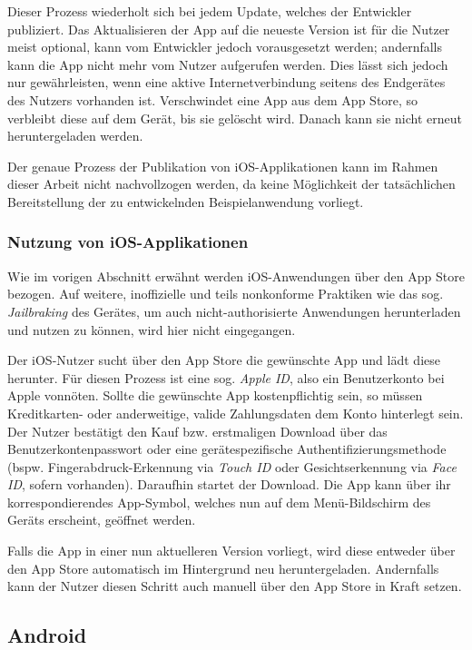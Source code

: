 Dieser Prozess wiederholt sich bei jedem Update, welches der Entwickler publiziert. Das Aktualisieren der App auf die neueste Version ist für die Nutzer meist optional, kann vom Entwickler jedoch vorausgesetzt werden; andernfalls kann die App nicht mehr vom Nutzer aufgerufen werden. Dies lässt sich jedoch nur gewährleisten, wenn eine aktive Internetverbindung seitens des Endgerätes des Nutzers vorhanden ist. Verschwindet eine App aus dem App Store, so verbleibt diese auf dem Gerät, bis sie gelöscht wird. Danach kann sie nicht erneut heruntergeladen werden.

Der genaue Prozess der Publikation von iOS-Applikationen kann im Rahmen dieser Arbeit nicht nachvollzogen werden, da keine Möglichkeit der tatsächlichen Bereitstellung der zu entwickelnden Beispielanwendung vorliegt.

\subsubsection{Nutzung von iOS-Applikationen}
Wie im vorigen Abschnitt erwähnt werden iOS-Anwendungen über den App Store bezogen. Auf weitere, inoffizielle und teils nonkonforme Praktiken wie das sog. \textit{Jailbraking} des Gerätes, um auch nicht-authorisierte Anwendungen herunterladen und nutzen zu können, wird hier nicht eingegangen.

Der iOS-Nutzer sucht über den App Store die gewünschte App und lädt diese herunter. Für diesen Prozess ist eine sog. \textit{Apple ID}, also ein Benutzerkonto bei Apple vonnöten. Sollte die gewünschte App kostenpflichtig sein, so müssen Kreditkarten- oder anderweitige, valide Zahlungsdaten dem Konto hinterlegt sein. Der Nutzer bestätigt den Kauf bzw. erstmaligen Download über das Benutzerkontenpasswort oder eine gerätespezifische Authentifizierungsmethode (bspw. Fingerabdruck-Erkennung via \textit{Touch ID} oder Gesichtserkennung via \textit{Face ID}, sofern vorhanden). Daraufhin startet der Download. Die App kann über ihr korrespondierendes App-Symbol, welches nun auf dem Menü-Bildschirm des Geräts erscheint, geöffnet werden.

Falls die App in einer nun aktuelleren Version vorliegt, wird diese entweder über den App Store automatisch im Hintergrund neu heruntergeladen. Andernfalls kann der Nutzer diesen Schritt auch manuell über den App Store in Kraft setzen.

\subsection{Android}

